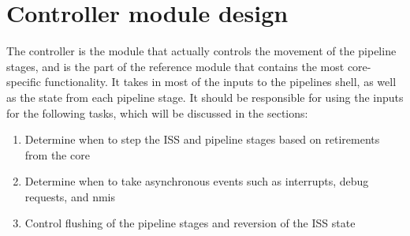 \section{Controller module design}

The controller is the module that actually controls the movement of the pipeline stages, and is the part of the reference module that contains the most core-specific functionality. It takes in most of the inputs to the pipelines shell, as well as the state from each pipeline stage. It should be responsible for using the inputs for the following tasks, which will be discussed in the sections:

\begin{enumerate}
    \item Determine when to step the ISS and pipeline stages based on retirements from the core
    \item Determine when to take asynchronous events such as interrupts, debug requests, and \acrshort{nmi}s
    \item Control flushing of the pipeline stages and reversion of the ISS state
\end{enumerate}

%

